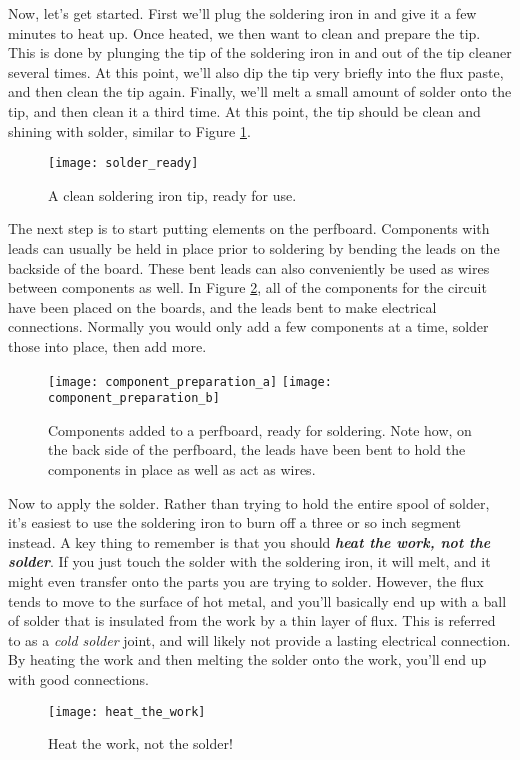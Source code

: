Now, let's get started. First we'll plug the soldering iron in and give it a 
few minutes to heat up. Once heated, we then want to clean and prepare the tip.
This is done by plunging the tip of the soldering iron in and out of the tip 
cleaner several times. At this point, we'll also dip the tip very briefly 
into the flux paste, and then clean the tip again. Finally, we'll melt a small 
amount of solder onto the tip, and then clean it a third time. At this point,
the tip should be clean and shining with solder, similar to Figure
\ref{fig:solder_ready}.
\begin{figure}[htbp!]
\centering
\texttt{[image: solder\_ready]}
\caption[A clean soldering iron tip]{A clean soldering iron tip, ready for
use.}
\label{fig:solder_ready}
\end{figure}

The next step is to start putting elements on the perfboard. Components with
leads can usually be held in place prior to soldering by bending the leads on
the backside of the board. These bent leads can also conveniently be used as
wires between components as well. In Figure \ref{fig:component_preparation},
all of the components for the circuit have been placed on the boards, and 
the leads bent to make electrical connections. Normally you would only add a 
few components at a time, solder those into place, then add more.
\begin{figure}[htbp!]
\centering
\texttt{[image: component\_preparation\_a]}
\texttt{[image: component\_preparation\_b]}
\caption[Components added to a perfboard, ready for soldering]{Components added
to a perfboard, ready for soldering. Note how, on the back side of the 
perfboard, the leads have been bent to hold the components in place as well as
act as wires.}
\label{fig:component_preparation}
\end{figure}

Now to apply the solder. Rather than trying to hold the entire spool of 
solder, it's easiest to use the soldering iron to burn off a three or so inch
segment instead. A key thing to remember is that you should
\textit{\textbf{heat the work, not the solder}}. If you just touch the solder
with the soldering iron, it will melt, and it might even transfer onto the
parts you are trying to solder. However, the flux tends to move to the 
surface of hot metal, and you'll basically end up with a ball of solder that
is insulated from the work by a thin layer of flux. This is referred to as a
\textit{cold solder} joint, and will likely not provide a lasting electrical
connection. By heating the work and then melting the solder onto the work,
you'll end up with good connections. 
\begin{figure}[htbp!]
\centering
\texttt{[image: heat\_the\_work]}
\caption[Heat the work, not the solder!]{Heat the work, not the solder!}
\label{fig:heat_the_work}
\end{figure}

